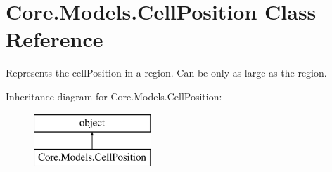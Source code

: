\hypertarget{classCore_1_1Models_1_1CellPosition}{}\section{Core.\+Models.\+Cell\+Position Class Reference}
\label{classCore_1_1Models_1_1CellPosition}


Represents the cell\+Position in a region. Can be only as large as the region.  


Inheritance diagram for Core.\+Models.\+Cell\+Position\+:\begin{figure}[H]
\begin{center}
\leavevmode
\includegraphics[height=2.000000cm]{classCore_1_1Models_1_1CellPosition}
\end{center}
\end{figure}
